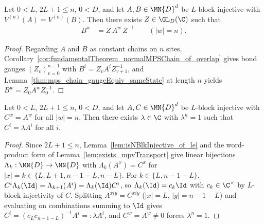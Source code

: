 \begin{lemma}%
    \label{lem:exists_conjugation_of_mpv_eq}
    \leanok
    Let $0 < L$, $2L + 1 \le n$, $0<D$, and let $A,B\in\MN{D}^d$ be $L$-block
    injective with $V^{(n)}(A)=V^{(n)}(B)$. Then there exists $Z\in\GL_D(\C)$
    such that
    \begin{align}
        B^w & = Z\, A^w\, Z^{-1}
        \qquad (|w|=n).
        \label{eq:peps_mps_length_n_conj}
    \end{align}
\end{lemma}
\begin{proof}\leanok
    Regarding $A$ and $B$ as constant chains on $n$ sites,
    Corollary~\ref{cor:fundamentalTheorem_normalMPSChain_of_overlap} gives bond
    gauges $(Z_v)_{v=0}^{n-1}$ with $B^i=Z_v A^i Z_{v+1}^{-1}$, and
    Lemma~\ref{thm:mps_chain_gaugeEquiv_sameState} at length $n$ yields
    $B^w = Z_0 A^w Z_0^{-1}$.
\end{proof}

\begin{lemma}%
    \label{lem:proportional_of_evalWord_eq}
    \leanok
    Let $0 < L$, $2L + 1 \le n$, $0 < D$, and let $A,C\in\MN{D}^d$ be $L$-block
    injective with $C^w = A^w$ for all $|w|=n$. Then there exists $\lambda\in\C$
    with $\lambda^n = 1$ such that $C^i = \lambda A^i$ for all $i$.
\end{lemma}
\begin{proof}\leanok
    Since $2L+1\le n$, Lemma~\ref{lem:isNBlkInjective_of_le} and the word-product
    form of Lemma~\ref{lem:exists_mpvTransport} give linear bijections
    $\Lambda_k:\MN{D}\to\MN{D}$ with $\Lambda_k(A^x)=C^x$ for $|x|=k\in\{L,L+1,n-1-L,n-L\}$.
    For $k\in\{L,n-1-L\}$, $C^i\Lambda_k(\Id)=\Lambda_{k+1}(A^i)=\Lambda_k(\Id)C^i$,
    so $\Lambda_k(\Id)=c_k\Id$ with $c_k\in\C^\times$ by $L$-block injectivity
    of $C$. Splitting $A^{xiy}=C^{xiy}$ ($|x|=L$, $|y|=n-1-L$) and evaluating on
    combinations summing to $\Id$ gives $C^i=(c_L c_{n-1-L})^{-1}A^i=:\lambda A^i$,
    and $C^w=A^w\neq 0$ forces $\lambda^n=1$.
\end{proof}

